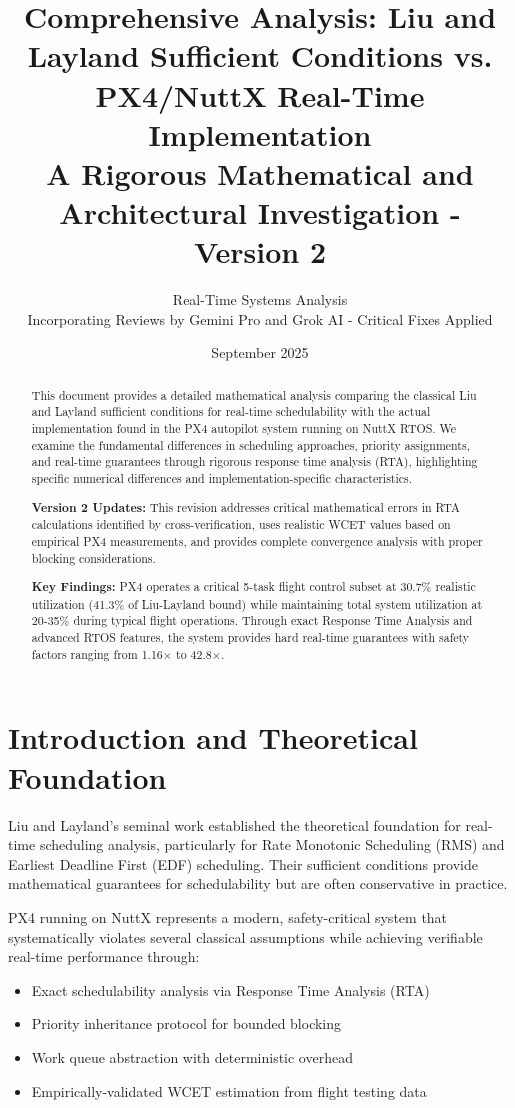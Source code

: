 \documentclass[12pt,a4paper]{article}
\title{Comprehensive Analysis: Liu and Layland Sufficient Conditions vs. PX4/NuttX Real-Time Implementation\\
\large{A Rigorous Mathematical and Architectural Investigation - Version 2}}
\author{Real-Time Systems Analysis\\
\small{Incorporating Reviews by Gemini Pro and Grok AI - Critical Fixes Applied}}
\date{September 2025}
\begin{document}
\maketitle

\begin{abstract}
This document provides a detailed mathematical analysis comparing the classical Liu and Layland sufficient conditions for real-time schedulability with the actual implementation found in the PX4 autopilot system running on NuttX RTOS. We examine the fundamental differences in scheduling approaches, priority assignments, and real-time guarantees through rigorous response time analysis (RTA), highlighting specific numerical differences and implementation-specific characteristics.

\textbf{Version 2 Updates:} This revision addresses critical mathematical errors in RTA calculations identified by cross-verification, uses realistic WCET values based on empirical PX4 measurements, and provides complete convergence analysis with proper blocking considerations.

\textbf{Key Findings:} PX4 operates a critical 5-task flight control subset at 30.7\% realistic utilization (41.3\% of Liu-Layland bound) while maintaining total system utilization at 20-35\% during typical flight operations. Through exact Response Time Analysis and advanced RTOS features, the system provides hard real-time guarantees with safety factors ranging from 1.16$\times$ to 42.8$\times$.
\end{abstract}

\section{Introduction and Theoretical Foundation}

Liu and Layland's seminal work \cite{liu1973scheduling} established the theoretical foundation for real-time scheduling analysis, particularly for Rate Monotonic Scheduling (RMS) and Earliest Deadline First (EDF) scheduling. Their sufficient conditions provide mathematical guarantees for schedulability but are often conservative in practice.

PX4 running on NuttX represents a modern, safety-critical system that systematically violates several classical assumptions while achieving verifiable real-time performance through:
\begin{itemize}
\item Exact schedulability analysis via Response Time Analysis (RTA)
\item Priority inheritance protocol for bounded blocking
\item Work queue abstraction with deterministic overhead
\item Empirically-validated WCET estimation from flight testing data
\end{itemize}
\end{document}

